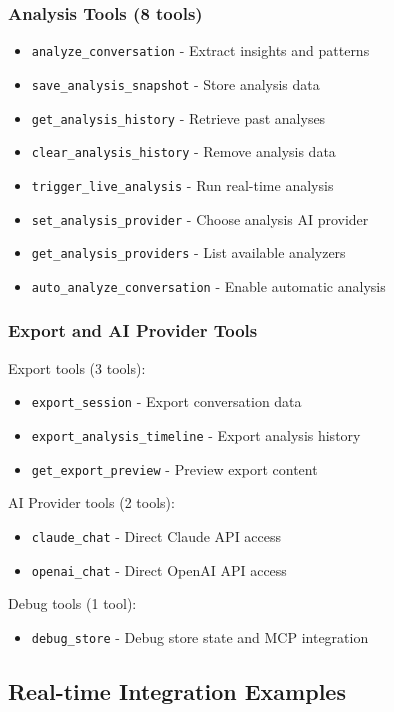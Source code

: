 \documentclass[11pt,letterpaper]{article}
\begin{document}
\subsubsection{Analysis Tools (8 tools)}
\begin{itemize}
    \item \texttt{analyze\_conversation} - Extract insights and patterns
    \item \texttt{save\_analysis\_snapshot} - Store analysis data
    \item \texttt{get\_analysis\_history} - Retrieve past analyses
    \item \texttt{clear\_analysis\_history} - Remove analysis data
    \item \texttt{trigger\_live\_analysis} - Run real-time analysis
    \item \texttt{set\_analysis\_provider} - Choose analysis AI provider
    \item \texttt{get\_analysis\_providers} - List available analyzers
    \item \texttt{auto\_analyze\_conversation} - Enable automatic analysis
\end{itemize}

\subsubsection{Export and AI Provider Tools}
Export tools (3 tools):
\begin{itemize}
    \item \texttt{export\_session} - Export conversation data
    \item \texttt{export\_analysis\_timeline} - Export analysis history
    \item \texttt{get\_export\_preview} - Preview export content
\end{itemize}

AI Provider tools (2 tools):
\begin{itemize}
    \item \texttt{claude\_chat} - Direct Claude API access
    \item \texttt{openai\_chat} - Direct OpenAI API access
\end{itemize}

Debug tools (1 tool):
\begin{itemize}
    \item \texttt{debug\_store} - Debug store state and MCP integration
\end{itemize}

\subsection{Real-time Integration Examples}
\end{document}
